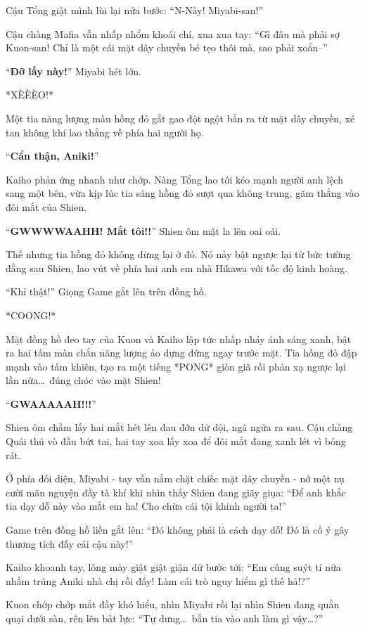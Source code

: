 \documentclass[../main.tex]{subfiles}
\begin{document}
Cậu Tổng giật mình lùi lại nửa bước: ``N-Này! Miyabi-san!''

Cậu chàng Mafia vẫn nhấp nhổm khoái chí, xua xua tay: ``Gì đâu mà phải sợ Kuon-san! Chỉ là một cái mặt dây chuyền bé tẹo thôi mà, sao phải xoắn--''

``\textbf{Đỡ lấy này!}'' Miyabi hét lớn.

*XÈÈÈO!*

Một tia năng lượng màu hồng đỏ gắt gao đột ngột bắn ra từ mặt dây chuyền, xé tan không khí lao thẳng về phía hai người họ.

``\textbf{Cẩn thận, Aniki!}''

Kaiho phản ứng nhanh như chớp. Nàng Tổng lao tới kéo mạnh người anh lệch sang một bên, vừa kịp lúc tia sáng hồng đỏ sượt qua không trung, găm thẳng vào đôi mắt của Shien.

``\textbf{GWWWWAAHH! Mắt tôi!!}'' Shien ôm mặt la lên oai oái.


Thế nhưng tia hồng đỏ không dừng lại ở đó. Nó nảy bật ngược lại từ bức tường đằng sau Shien, lao vút về phía hai anh em nhà Hikawa với tốc độ kinh hoàng.

``Khỉ thật!'' Giọng Game gắt lên trên đồng hồ.

*COONG!*

Mặt đồng hồ đeo tay của Kuon và Kaiho lập tức nhấp nháy ánh sáng xanh, bật ra hai tấm màn chắn năng lượng ảo dựng đứng ngay trước mặt. Tia hồng đỏ đập mạnh vào tấm khiên, tạo ra một tiếng *PONG* giòn giã rồi phản xạ ngược lại lần nữa\dots\ đúng chóc vào mặt Shien!

``\textbf{GWAAAAAH!!!}''

Shien ôm chầm lấy hai mắt hét lên đau đớn dữ dội, ngã ngửa ra sau. Cậu chàng Quái thú vò đầu bứt tai, hai tay xoa lấy xoa để đôi mắt đang xanh lét vì bỏng rát.

Ở phía đối diện, Miyabi - tay vẫn nắm chặt chiếc mặt dây chuyền - nở một nụ cười mãn nguyện đầy tà khí khi nhìn thấy Shien đang giãy giụa: ``Để anh khắc tia dạy dỗ này vào mắt em ha! Cho chừa cái tội khinh người ta!''

Game trên đồng hồ liền gắt lên: ``Đó không phải là cách dạy dỗ! Đó là cố ý gây thương tích đấy cái cậu này!''

Kaiho khoanh tay, lông mày giật giật giận dữ bước tới: ``Em cũng suýt tí nữa nhắm trúng Aniki nhà chị rồi đấy! Làm cái trò nguy hiểm gì thế hả!?''

Kuon chớp chớp mắt đầy khó hiểu, nhìn Miyabi rồi lại nhìn Shien đang quằn quại dưới sàn, rên lên bất lực: ``Tự dưng\dots\ bắn tia vào anh làm gì vậy\dots?''
\end{document}
